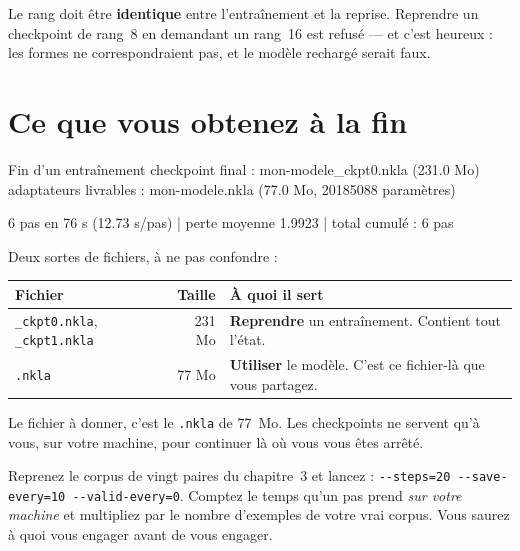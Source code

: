 \begin{nkpiege}
Le rang doit être \textbf{identique} entre l'entraînement et la reprise. Reprendre
un checkpoint de rang~8 en demandant un rang~16 est refusé — et c'est heureux :
les formes ne correspondraient pas, et le modèle rechargé serait faux.
\end{nkpiege}

\section{Ce que vous obtenez à la fin}

\begin{nkcode}[]{Fin d'un entraînement}
checkpoint final : mon-modele_ckpt0.nkla (231.0 Mo)
adaptateurs livrables : mon-modele.nkla (77.0 Mo, 20185088 paramètres)

6 pas en 76 s (12.73 s/pas) | perte moyenne 1.9923 | total cumulé : 6 pas
\end{nkcode}

Deux sortes de fichiers, à ne pas confondre :

\begin{center}
\begin{tabular}{p{4.3cm}rp{7.2cm}}
\toprule
\textbf{Fichier} & \textbf{Taille} & \textbf{À quoi il sert} \\
\midrule
\texttt{\_ckpt0.nkla}, \texttt{\_ckpt1.nkla} & 231 Mo & \textbf{Reprendre} un
   entraînement. Contient tout l'état. \\
\texttt{.nkla} & 77 Mo & \textbf{Utiliser} le modèle. C'est ce fichier-là que
   vous partagez. \\
\bottomrule
\end{tabular}
\end{center}

\begin{nkretenir}
Le fichier à donner, c'est le \texttt{.nkla} de 77~Mo. Les checkpoints ne
servent qu'à vous, sur votre machine, pour continuer là où vous vous êtes
arrêté.
\end{nkretenir}

\begin{nkexo}
Reprenez le corpus de vingt paires du chapitre~3 et lancez :
\texttt{-{}-steps=20 -{}-save-every=10 -{}-valid-every=0}. Comptez le temps
qu'un pas prend \emph{sur votre machine} et multipliez par le nombre d'exemples
de votre vrai corpus. Vous saurez à quoi vous engager avant de vous engager.
\end{nkexo}
